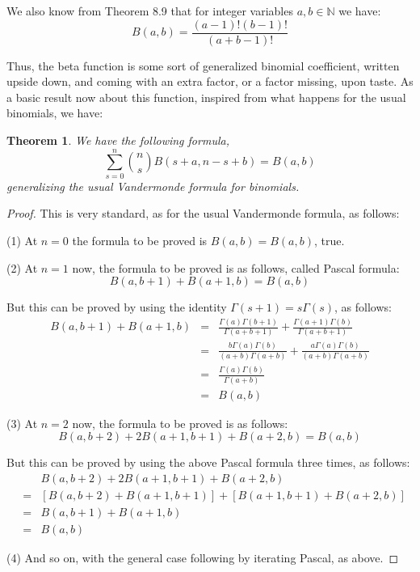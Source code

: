 \documentclass[12pt]{amsbook}
\newtheorem{theorem}{Theorem}[chapter]
\begin{document}
We also know from Theorem 8.9 that for integer variables $a,b\in\mathbb N$ we have:
$$B(a,b)=\frac{(a-1)!(b-1)!}{(a+b-1)!}$$

Thus, the beta function is some sort of generalized binomial coefficient, written upside down, and coming with an extra factor, or a factor missing, upon taste. As a basic result now about this function, inspired from what happens for the usual binomials, we have:

\begin{theorem}
We have the following formula,
$$\sum_{s=0}^n\binom{n}{s}B(s+a,n-s+b)=B(a,b)$$
generalizing the usual Vandermonde formula for binomials.
\end{theorem}

\begin{proof}
This is very standard, as for the usual Vandermonde formula, as follows:

\medskip

(1) At $n=0$ the formula to be proved is $B(a,b)=B(a,b)$, true.

\medskip

(2) At $n=1$ now, the formula to be proved is as follows, called Pascal formula:
$$B(a,b+1)+B(a+1,b)=B(a,b)$$

But this can be proved by using the identity $\Gamma(s+1)=s\Gamma(s)$, as follows:
\begin{eqnarray*}
B(a,b+1)+B(a+1,b)
&=&\frac{\Gamma(a)\Gamma(b+1)}{\Gamma(a+b+1)}+\frac{\Gamma(a+1)\Gamma(b)}{\Gamma(a+b+1)}\\
&=&\frac{b\Gamma(a)\Gamma(b)}{(a+b)\Gamma(a+b)}+\frac{a\Gamma(a)\Gamma(b)}{(a+b)\Gamma(a+b)}\\
&=&\frac{\Gamma(a)\Gamma(b)}{\Gamma(a+b)}\\
&=&B(a,b)
\end{eqnarray*}

(3) At $n=2$ now, the formula to be proved is as follows:
$$B(a,b+2)+2B(a+1,b+1)+B(a+2,b)=B(a,b)$$

But this can be proved by using the above Pascal formula three times, as follows:
\begin{eqnarray*}
&&B(a,b+2)+2B(a+1,b+1)+B(a+2,b)\\
&=&[B(a,b+2)+B(a+1,b+1)]+[B(a+1,b+1)+B(a+2,b)]\\
&=&B(a,b+1)+B(a+1,b)\\
&=&B(a,b)
\end{eqnarray*}

(4) And so on, with the general case following by iterating Pascal, as above.
\end{proof}
\end{document}

